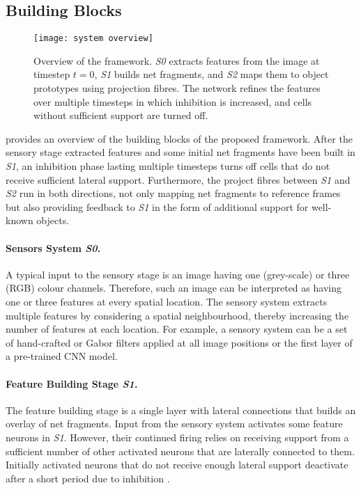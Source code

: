\subsection{Building Blocks}
\begin{figure}[h]
    \centering
    \texttt{[image: system overview]}
    \caption[Overview of the framework]{Overview of the framework. \emph{S0} extracts features from the image at timestep $t=0$, \emph{S1} builds net fragments, and \emph{S2} maps them to object prototypes using projection fibres. The network refines the features over multiple timesteps in which inhibition is increased, and cells without sufficient support are turned off.}
\end{figure}

 provides an overview of the building blocks of the proposed framework. After the sensory stage extracted features and some initial net fragments have been built in \emph{S1}, an inhibition phase  lasting multiple timesteps turns off cells that do not receive sufficient lateral support. Furthermore, the project fibres between \emph{S1} and \emph{S2} run in both directions, not only mapping net fragments to reference frames but also providing feedback to \emph{S1} in the form of additional support for well-known objects.

\paragraph{Sensors System \emph{S0}.} A typical input to the sensory stage is an image having one (grey-scale) or three (RGB) colour channels. Therefore, such an image can be interpreted as having one or three features at every spatial location.
The sensory system extracts multiple features by considering a spatial neighbourhood, thereby increasing the number of features at each location.
For example, a sensory system can be a set of hand-crafted or Gabor filters applied at all image positions or the first layer of a pre-trained CNN model.

\paragraph{Feature Building Stage \emph{S1}.} The feature building stage is a single layer with lateral connections  that builds an overlay of net fragments. Input from the sensory system activates some feature neurons in \emph{S1}. However, their continued firing relies on receiving support from a sufficient number of other activated neurons that are laterally connected to them. Initially activated neurons that do not receive enough lateral support deactivate after a short period due to inhibition .

